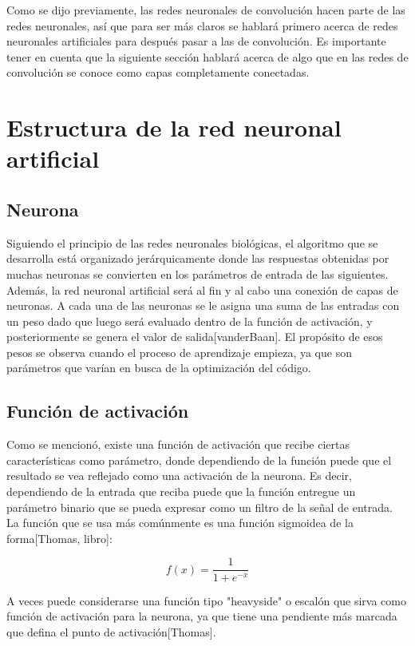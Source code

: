 \documentclass[../main.tex]{subfiles}
\begin{document}
Como se dijo previamente, las redes neuronales de convolución hacen parte de las redes neuronales, así que para ser más claros se hablará primero acerca de redes neuronales artificiales para después pasar a las de convolución. Es importante tener en cuenta que la siguiente sección hablará acerca de algo que en las redes de convolución se conoce como capas completamente conectadas. \\

\section{Estructura de la red neuronal artificial}

\subsection{Neurona}

Siguiendo el principio de las redes neuronales biológicas, el algoritmo que se desarrolla está organizado jerárquicamente donde las respuestas obtenidas por muchas neuronas se convierten en los parámetros de entrada de las siguientes. Además, la red neuronal artificial será al fin y al cabo una conexión de capas de neuronas. A cada una de las neuronas se le asigna una suma de las entradas con un peso dado que luego será evaluado dentro de la función de activación, y posteriormente se genera el valor de salida[vanderBaan]. El propósito de esos pesos se observa cuando el proceso de aprendizaje empieza, ya que son parámetros que varían en busca de la optimización del código. \\  

\subsection{Función de activación}
Como se mencionó, existe una función de activación que recibe ciertas características como parámetro, donde dependiendo de la función puede que el resultado se vea reflejado como una activación de la neurona. Es decir, dependiendo de la entrada que reciba puede que la función entregue un parámetro binario que se pueda expresar como un filtro de la señal de entrada. La función que se usa más comúnmente es una función sigmoidea de la forma[Thomas, libro]: 

\begin{equation}
    f(x) = \frac{1}{1+e^{-x}}
\end{equation}

\noindent
A veces puede considerarse una función tipo "heavyside" o escalón que sirva como función de activación para la neurona, ya que tiene una pendiente más marcada que defina el punto de activación[Thomas].  \\
\end{document}
